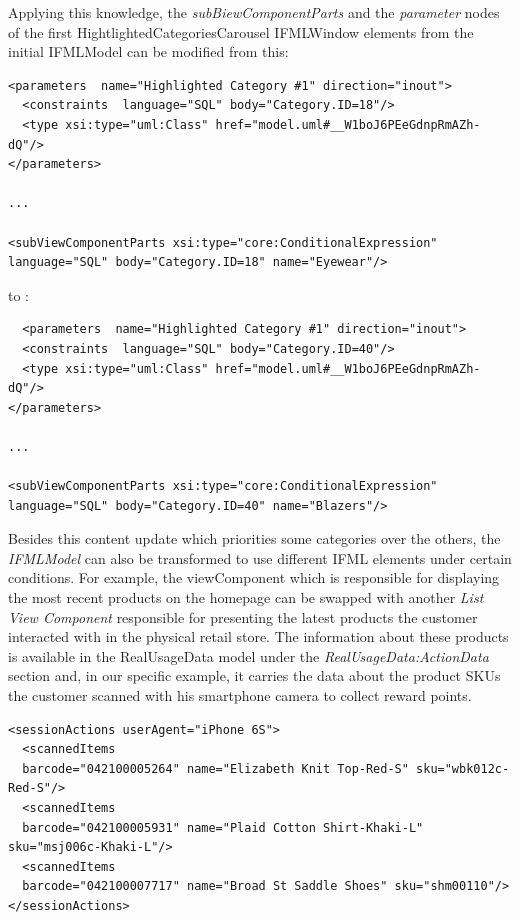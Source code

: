 Applying this knowledge, the \textit{subBiewComponentParts} and the \textit{parameter} nodes of the first HightlightedCategoriesCarousel IFMLWindow elements from the initial IFMLModel can be modified from this:

\vspace{0.5cm}
\lstset{language=XML}
\begin{lstlisting} 
<parameters  name="Highlighted Category #1" direction="inout">
  <constraints  language="SQL" body="Category.ID=18"/>
  <type xsi:type="uml:Class" href="model.uml#__W1boJ6PEeGdnpRmAZh-dQ"/>
</parameters>

...

<subViewComponentParts xsi:type="core:ConditionalExpression"  language="SQL" body="Category.ID=18" name="Eyewear"/>
\end{lstlisting}
\vspace{0.5cm}

to :

\vspace{0.5cm}
\lstset{language=XML}
\begin{lstlisting} 
  <parameters  name="Highlighted Category #1" direction="inout">
  <constraints  language="SQL" body="Category.ID=40"/>
  <type xsi:type="uml:Class" href="model.uml#__W1boJ6PEeGdnpRmAZh-dQ"/>
</parameters>

...

<subViewComponentParts xsi:type="core:ConditionalExpression"  language="SQL" body="Category.ID=40" name="Blazers"/>
\end{lstlisting}
\vspace{0.5cm}

Besides this content update which priorities some categories over the others, the \textit{IFMLModel} can also be transformed to use different IFML elements under certain conditions. For example, the viewComponent which is responsible for displaying the most recent products on the homepage can be swapped with another \textit{List View Component} responsible for presenting the latest products the customer interacted with in the physical retail store. The information about these products is available in the RealUsageData model under the \textit{RealUsageData:ActionData} section and, in our specific example, it carries the data about the product SKUs the customer scanned with his smartphone camera to collect reward points.

\vspace{0.5cm}
\lstset{language=XML}
\begin{lstlisting} 
<sessionActions userAgent="iPhone 6S">
  <scannedItems 
  barcode="042100005264" name="Elizabeth Knit Top-Red-S" sku="wbk012c-Red-S"/>
  <scannedItems 
  barcode="042100005931" name="Plaid Cotton Shirt-Khaki-L" sku="msj006c-Khaki-L"/>
  <scannedItems 
  barcode="042100007717" name="Broad St Saddle Shoes" sku="shm00110"/>
</sessionActions>
\end{lstlisting}
\vspace{0.5cm}


